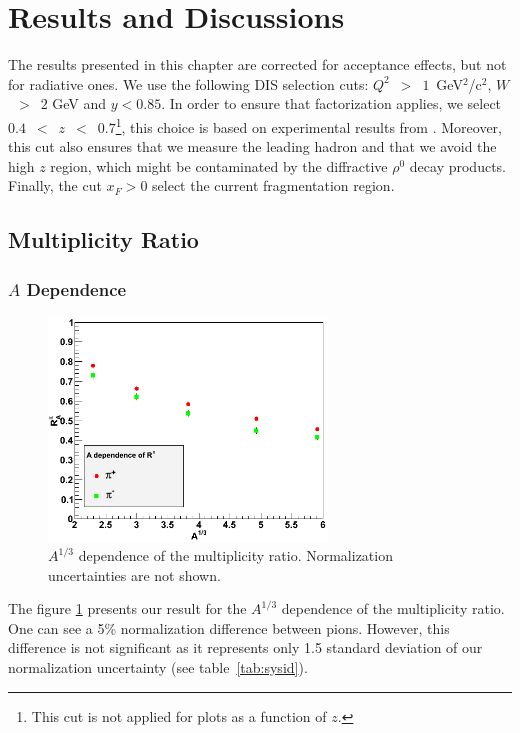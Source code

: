 \section{Results and Discussions}
\label{chap:results}

The results presented in this chapter are corrected for acceptance effects, 
but not for radiative ones. We use the following DIS selection cuts: 
$Q^2$~$>$~$1$~GeV$^2$/c$^2$, $W$~$>$~$2$ GeV and $y<0.85$. In order to ensure that 
factorization applies, we select $0.4$~$<$~$z$~$<$~$0.7$\footnote{This cut is not 
applied for plots as a function of $z$.}, this choice is based on experimental results from 
\cite{Asaturyan:2011mq}. Moreover, this cut also ensures that we measure the leading 
hadron and that we avoid the high $z$ region, which might be contaminated by 
the diffractive $\rho^0$ decay products. Finally, the cut $x_F > 0$ select the 
current fragmentation region.

\subsection{Multiplicity Ratio}

\subsubsection{$A$ Dependence}
\label{sec:resA}

\begin{figure}[p]
\centering
\includegraphics[width=7.4cm] {chap6-fig/F_RvA.png} 
\caption {$A^{1/3}$ dependence of the multiplicity ratio. Normalization 
uncertainties are not shown.}
\label{fig:RA}
\end{figure}

The figure \ref{fig:RA} presents our result for the $A^{1/3}$ dependence of 
the multiplicity ratio. One can see a 5\% normalization difference between
pions. However, this difference is not significant as it represents only 1.5 
standard deviation of our normalization uncertainty (see table~\ref{tab:sysid}).

